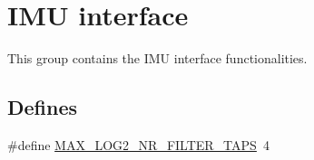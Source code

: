 \hypertarget{group__imu__interface}{
\section{\-I\-M\-U interface}
\label{group__imu__interface}
}


\-This group contains the \-I\-M\-U interface functionalities.  


\subsection*{\-Defines}
\begin{DoxyCompactItemize}
\item 
\#define \hyperlink{group__imu__interface_ga1675e8544a889ebf498d8a076eafd13a}{\-M\-A\-X\-\_\-\-L\-O\-G2\-\_\-\-N\-R\-\_\-\-F\-I\-L\-T\-E\-R\-\_\-\-T\-A\-P\-S}~4
\end{DoxyCompactItemize}
